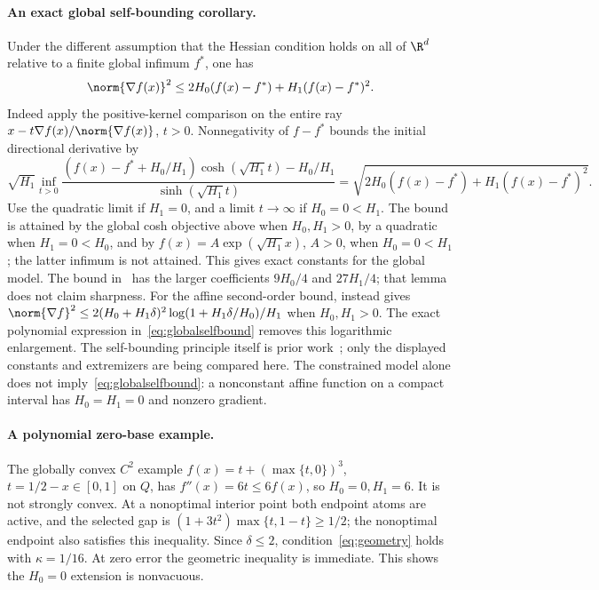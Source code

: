 \paragraph{An exact global self-bounding corollary.}
Under the different assumption that the Hessian condition holds on
all of $\R^d$ relative to a finite global infimum $f^*$, one has
\begin{equation}\label{eq:globalselfbound}
 \norm{\nabla f(x)}^2\le2H_0(f(x)-f^*)+H_1(f(x)-f^*)^2.
\end{equation}
Indeed apply the positive-kernel comparison on the entire ray
$x-t\nabla f(x)/\norm{\nabla f(x)}$, $t>0$. Nonnegativity of
$f-f^*$ bounds the initial directional derivative by
\[
 \sqrt{H_1}\inf_{t>0}
 \frac{(f(x)-f^*+H_0/H_1)\cosh(\sqrt{H_1}t)-H_0/H_1}
 {\sinh(\sqrt{H_1}t)}
 =\sqrt{2H_0(f(x)-f^*)+H_1(f(x)-f^*)^2}.
\]
Use the quadratic limit if $H_1=0$, and a limit $t\to\infty$
if $H_0=0<H_1$. The bound is attained by the global cosh objective
above when $H_0,H_1>0$, by a quadratic when $H_1=0<H_0$, and by
$f(x)=A\exp(\sqrt{H_1}x)$, $A>0$, when $H_0=0<H_1$; the latter
infimum is not attained. This gives exact constants for the
global model. The bound in~\cite[Appendix G, Lemma 6]{warmup}
has the larger coefficients $9H_0/4$ and $27H_1/4$; that lemma
does not claim sharpness. For the affine second-order bound,
\cite[Corollary 1]{caoselfbound} instead gives
$\norm{\nabla f}^2\le2(H_0+H_1\delta)^2
\log(1+H_1\delta/H_0)/H_1$ when $H_0,H_1>0$.
The exact polynomial expression in~\eqref{eq:globalselfbound}
removes this logarithmic enlargement. The self-bounding principle
itself is prior work~\cite[Lemma 11]{kale}; only the displayed
constants and extremizers are being compared here.
The constrained model alone does not
imply~\eqref{eq:globalselfbound}: a nonconstant affine function
on a compact interval has $H_0=H_1=0$ and nonzero gradient.

\paragraph{A polynomial zero-base example.}
The globally convex $C^2$ example $f(x)=t+(\max\{t,0\})^3$,
$t=1/2-x\in[0,1]$ on $Q$, has
$f''(x)=6t\le6f(x)$, so $H_0=0,H_1=6$.
It is not strongly convex. At a nonoptimal interior point both
endpoint atoms are active, and the selected gap is
$(1+3t^2)\max\{t,1-t\}\ge1/2$; the nonoptimal endpoint also satisfies
this inequality. Since $\delta\le2$, condition~\eqref{eq:geometry}
holds with $\kappa=1/16$. At zero error the geometric inequality is
immediate. This shows the $H_0=0$ extension is nonvacuous.

